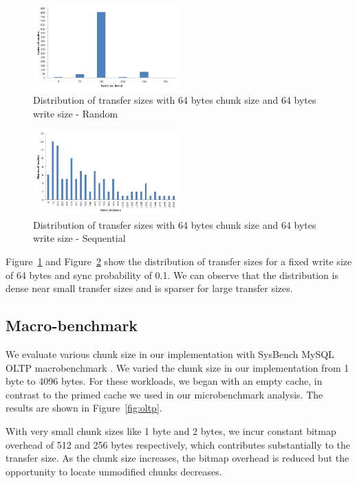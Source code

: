 \documentclass[10pt,twocolumn]{article}
\begin{document}
\begin{figure}[b]
  \centering
  \includegraphics[width=0.50\textwidth]{figs/RandDist.png}
  \caption{Distribution of transfer sizes with 64 bytes chunk size and 64 bytes write size - Random}
  \label{fig:randdist}
\end{figure}

\begin{figure}[t]
  \centering
  \includegraphics[width=0.50\textwidth]{figs/SeqDist.png}
  \caption{Distribution of transfer sizes with 64 bytes chunk size and 64 bytes write size - Sequential}
  \label{fig:seqdist}
\end{figure}

Figure~\ref{fig:randdist} and Figure~\ref{fig:seqdist} show the distribution of
transfer sizes for a fixed write size of 64 bytes and sync probability of 0.1. %
We can observe that the distribution is dense near small transfer sizes and is
sparser for large transfer sizes. %

\subsection{Macro-benchmark}
\label{sub:macro}

We evaluate various chunk size in our implementation with SysBench MySQL OLTP
macrobenchmark \cite{kopytoc04}. %
We varied the chunk size in our implementation from 1 byte to 4096 bytes. %
For these workloads, we began with an empty cache, in contrast to the primed
cache we used in our microbenchmark analysis. %
The results are shown in Figure~\ref{fig:oltp}. %

With very small chunk sizes like 1 byte and 2 bytes, we incur constant bitmap
overhead of 512 and 256 bytes respectively, which contributes substantially to
the transfer size. %
As the chunk size increases, the bitmap overhead is reduced but the opportunity
to locate unmodified chunks decreases. %
\end{document}
